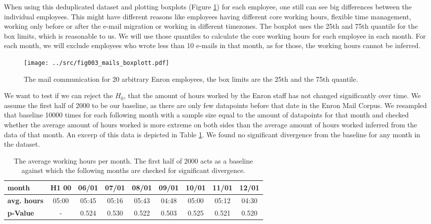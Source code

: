 \documentclass{article}
\begin{document}
When using this deduplicated dataset and plotting boxplots (Figure
\ref{fig:mailboxplot}) for each employee, one still can see big differences
between the individual employees. This might have different reasons like
employees having different core working hours, flexible time management, working
only before or after the e-mail migration or working in different timezones. The
boxplot uses the 25th and 75th quantile for the box limits, which is reasonable
to us. We will use those quantiles to calculate the core working hours for each
employee in each month. For each month, we will exclude employees who wrote less
than 10 e-mails in that month, as for those, the working hours cannot be
inferred. 

\begin{figure}
  \centering
  \texttt{[image: ../src/fig003\_mails\_boxplott.pdf]}
   \caption{The mail communication for 20 arbitrary Enron employees, the box
   limits are the 25th and the 75th quantile.}
  \label{fig:mailboxplot}
\end{figure}

We want to test if we can reject the $H_0$, that the amount of hours worked by
the Enron staff has not changed significantly over time. We assume the first
half of 2000 to be our baseline, as there are only few datapoints before that
date in the Enron Mail Corpus. We resampled that baseline 10000 times for each
following month with a sample size equal to the amount of datapoints for that
month and checked whether the average amount of hours worked is more extreme on
both sides than the average amount of hours worked inferred from the data of
that month. An excerp of this data is depicted in Table \ref{ta:pvalues}. We
found no significant divergence from the baseline for any month in the dataset.

\begin{table}
  \caption{The average working hours per month. The first half of 2000 acts as a
  baseline against which the following months are checked for significant
  divergence.}
  \centering
  \begin{tabular}{|l|c|c|c|c|c|c|c|c|}
    \hline
    \textbf{month} & H1 00 & 06/01 & 07/01 & 08/01 & 09/01 & 10/01 & 11/01 &
    12/01 \\
    \hline
    \textbf{avg. hours} & 05:00 & 05:45 & 05:16 & 05:43 & 04:48 & 05:00 & 05:12
    & 04:30 \\
    \hline
    \textbf{p-Value} & - & 0.524 & 0.530 & 0.522 & 0.503 & 0.525 & 0.521 & 0.520
    \\
    \hline
  \end{tabular}
  \label{ta:pvalues}
\end{table}
\end{document}
